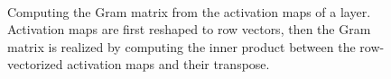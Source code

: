 \begin{figure}[t]
\begin{center}
	\\
	\caption[Computing the Gram matrix from activation maps]{Computing the Gram matrix from the activation maps of a layer. Activation maps are first reshaped to row vectors, then the Gram matrix is realized by computing the inner product between the row-vectorized activation maps and their transpose.}
	\vspace{-0.65cm}
	\label{fig:gram_matrix}
\end{center}
\end{figure}